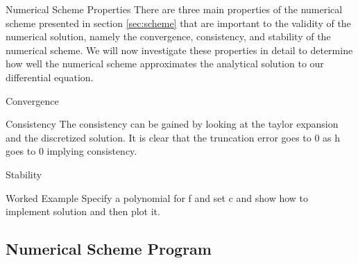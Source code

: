 \documentclass{article}
\begin{document}
\begin{section}{Numerical Scheme Properties}\label{sec:scheme_prop}
  There are three main properties of the numerical scheme presented in section
  \ref{sec:scheme} that are important to the validity of the numerical solution,
  namely the convergence, consistency, and stability of the numerical scheme.
  We will now investigate these properties in detail to determine how well
  the numerical scheme approximates the analytical solution to our differential
  equation.

  \begin{subsection}{Convergence}
  \end{subsection}

  \begin{subsection}{Consistency}
    The consistency can be gained by looking at the taylor expansion and the
    discretized solution. It is clear that the truncation error goes to 0
    as h goes to 0 implying consistency.
  \end{subsection}

  \begin{subsection}{Stability}
  \end{subsection}

\end{section}


\begin{section}{Worked Example}
  Specify a polynomial for f and set c and show how to implement solution and
  then plot it.
\end{section}


\newpage
\begin{appendices}
  \section{Numerical Scheme Program}
\end{appendices}
\end{document}
